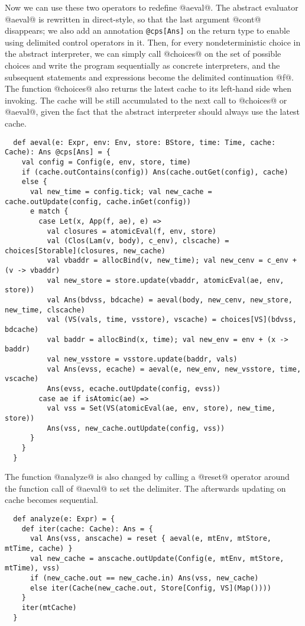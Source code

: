 \documentclass[acmsmall, review]{acmart}\settopmatter{}
\begin{document}
Now we can use these two operators to redefine @aeval@. The abstract evaluator @aeval@ is
rewritten in direct-style, so that the last argument @cont@ disappears; we also add an 
annotation \verb|@cps[Ans]| on the return type to enable using delimited control operators 
in it.
Then, for every nondeterministic choice in the abstract interpreter, we can simply call 
@choices@ on the set of possible choices and write the program sequentially as concrete 
interpreters, and the subsequent statements and expressions become the delimited continuation
@f@. The function @choices@ also returns the latest cache to its left-hand side when invoking.
The cache will be still accumulated to the next call to @choices@ or @aeval@, 
given the fact that the abstract interpreter should always use the latest cache.

\begin{lstlisting}
  def aeval(e: Expr, env: Env, store: BStore, time: Time, cache: Cache): Ans @cps[Ans] = {
    val config = Config(e, env, store, time)
    if (cache.outContains(config)) Ans(cache.outGet(config), cache)
    else {
      val new_time = config.tick; val new_cache = cache.outUpdate(config, cache.inGet(config))
      e match {
        case Let(x, App(f, ae), e) =>
          val closures = atomicEval(f, env, store)
          val (Clos(Lam(v, body), c_env), clscache) = choices[Storable](closures, new_cache)
          val vbaddr = allocBind(v, new_time); val new_cenv = c_env + (v -> vbaddr)
          val new_store = store.update(vbaddr, atomicEval(ae, env, store))
          val Ans(bdvss, bdcache) = aeval(body, new_cenv, new_store, new_time, clscache)
          val (VS(vals, time, vsstore), vscache) = choices[VS](bdvss, bdcache)
          val baddr = allocBind(x, time); val new_env = env + (x -> baddr)
          val new_vsstore = vsstore.update(baddr, vals)
          val Ans(evss, ecache) = aeval(e, new_env, new_vsstore, time, vscache)
          Ans(evss, ecache.outUpdate(config, evss))
        case ae if isAtomic(ae) =>
          val vss = Set(VS(atomicEval(ae, env, store), new_time, store))
          Ans(vss, new_cache.outUpdate(config, vss))
      }
    }
  }
\end{lstlisting}

The function @analyze@ is also changed by calling a @reset@ operator around the function 
call of @aeval@ to set the delimiter. The afterwards updating on cache becomes sequential.

\begin{lstlisting}
  def analyze(e: Expr) = {
    def iter(cache: Cache): Ans = {
      val Ans(vss, anscache) = reset { aeval(e, mtEnv, mtStore, mtTime, cache) }
      val new_cache = anscache.outUpdate(Config(e, mtEnv, mtStore, mtTime), vss)
      if (new_cache.out == new_cache.in) Ans(vss, new_cache)
      else iter(Cache(new_cache.out, Store[Config, VS](Map())))
    }
    iter(mtCache)
  }
\end{lstlisting}
\end{document}
